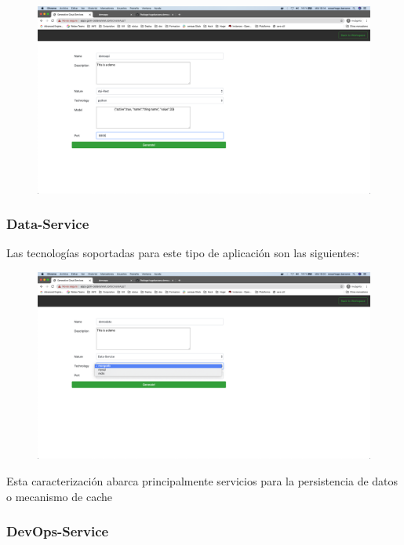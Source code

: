 \documentclass[a4paper,11pt]{book}
\begin{document}
\begin{figure}[H]
\centering
\includegraphics[scale=0.2]{imagenes/casouso/19.png}
\caption{   }
\end{figure}

\subsubsection{Data-Service}

Las tecnologías soportadas para este tipo de aplicación son las siguientes: 

\begin{figure}[H]
\centering
\includegraphics[scale=0.2]{imagenes/casouso/20.png}
\caption{   }
\end{figure}

Esta caracterización abarca principalmente servicios para la persistencia de datos o mecanismo de cache

\subsubsection{DevOps-Service}
\end{document}
